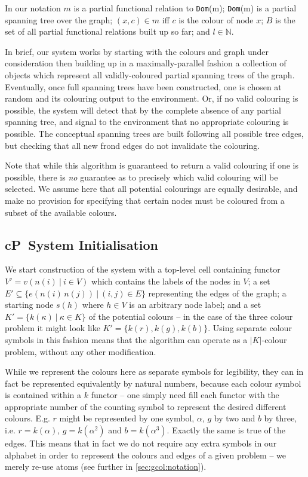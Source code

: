 In our notation \(m\) is a partial functional relation to \texttt{Dom}(m); \texttt{Dom}(m) is a partial spanning tree over the graph; \((x, c) \in m\) iff \(c\) is the colour of node \(x\);  \(B\) is the set of all partial functional relations built up so far; and \(l \in \mathbb{N}\).

In brief, our system works by starting with the colours and graph under consideration then building up in a maximally-parallel fashion a collection of objects which represent all validly-coloured partial spanning trees of the graph.  Eventually, once full spanning trees have been constructed, one is chosen at random and its colouring output to the environment.  Or, if no valid colouring is possible, the system will detect that by the complete absence of any partial spanning tree, and signal to the environment that no appropriate colouring is possible.  The conceptual spanning trees are built following all possible tree edges, but checking that all new frond edges do not invalidate the colouring.

Note that while this algorithm is guaranteed to return a valid colouring if one is possible, there is \emph{no} guarantee as to precisely which valid colouring will be selected.  We assume here that all potential colourings are equally desirable, and make no provision for specifying that certain nodes must be coloured from a subset of the available colours.

\subsection{\label{sec:gcol:sysinit}cP~System Initialisation}
We start construction of the system with a top-level cell containing functor \(V' = v(n(i)~|~i \in V)\) which contains the labels of the nodes in \(V\); a set \(E' \subseteq \{e(n(i)\,n(j))~|~(i,j) \in E\}\) representing the edges of the graph; a starting node \(s(h)\) where \(h \in V\) is an arbitrary node label; and a set \(K' = \{k(\kappa)~|~\kappa \in K\}\) of  the potential colours -- in the case of the three colour problem it might look like \(K' = \{k(r), k(g), k(b)\}\). Using separate colour symbols in this fashion means that the algorithm can operate as a \(|K|\)-colour problem, without any other modification.  %

While we represent the colours here as separate symbols for legibility, they can in fact be represented equivalently by natural numbers, because each colour symbol is contained within a \(k\) functor -- one simply need fill each functor with the appropriate number of the counting symbol to represent the desired different colours.  E.g. \(r\) might be represented by one symbol, \(\alpha\), \(g\) by two and \(b\) by three, i.e. \(r = k(\alpha)\), \(g = k(\alpha^2)\) and \(b = k(\alpha^3)\).  Exactly the same is true of the edges.  This means that in fact we do not require any extra symbols in our alphabet in order to represent the colours and edges of a given problem -- we merely re-use atoms (see further in \autoref{sec:gcol:notation}).

